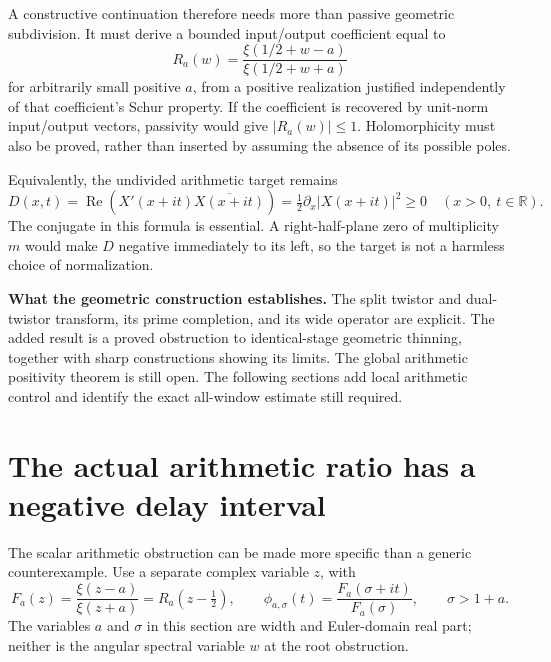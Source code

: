 \documentclass[11pt,letterpaper]{article}
\newcommand{\Rea}{\operatorname{Re}}
\begin{document}
A constructive continuation therefore needs more than passive geometric subdivision. It must derive a bounded input/output coefficient equal to
\[
 R_a(w)=\frac{\xi(1/2+w-a)}{\xi(1/2+w+a)}
\]
for arbitrarily small positive $a$, from a positive realization justified independently of that coefficient's Schur property. If the coefficient is recovered by unit-norm input/output vectors, passivity would give $|R_a(w)|\leq1$. Holomorphicity must also be proved, rather than inserted by assuming the absence of its possible poles.

Equivalently, the undivided arithmetic target remains
\[
 D(x,t)=\Rea\!\left(X'(x+it)\overline{X(x+it)}\right)
       =\tfrac12\partial_x|X(x+it)|^2\geq0
 \quad(x>0,\ t\in\mathbb R).
\]
The conjugate in this formula is essential. A right-half-plane zero of multiplicity $m$ would make $D$ negative immediately to its left, so the target is not a harmless choice of normalization.

\textbf{What the geometric construction establishes.} The split twistor and dual-twistor transform, its prime completion, and its wide operator are explicit. The added result is a proved obstruction to identical-stage geometric thinning, together with sharp constructions showing its limits. The global arithmetic positivity theorem is still open. The following sections add local arithmetic control and identify the exact all-window estimate still required.

\section{The actual arithmetic ratio has a negative delay interval}
The scalar arithmetic obstruction can be made more specific than a generic counterexample. Use a separate complex variable $z$, with
\[
 F_a(z)=\frac{\xi(z-a)}{\xi(z+a)}=R_a(z-\tfrac12),\qquad
 \phi_{a,\sigma}(t)=\frac{F_a(\sigma+it)}{F_a(\sigma)},\qquad \sigma>1+a.
\]
The variables $a$ and $\sigma$ in this section are width and Euler-domain real part; neither is the angular spectral variable $w$ at the root obstruction.
\end{document}
